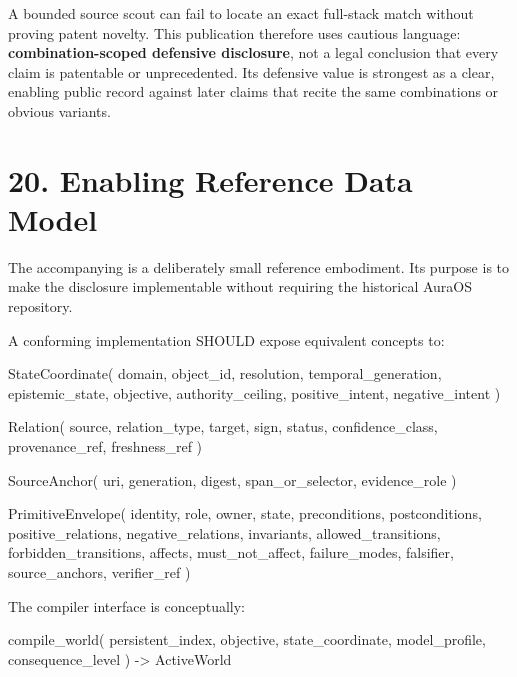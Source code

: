\documentclass[
  10pt,
  letterpaper,
]{article}
\newenvironment{Shaded}{}{}
\newcommand{\NormalTok}[1]{#1}
\newcommand{\OperatorTok}[1]{\textcolor[rgb]{0.40,0.40,0.40}{#1}}
\begin{document}
A bounded source scout can fail to locate an exact full-stack match
without proving patent novelty. This publication therefore uses cautious
language: \textbf{combination-scoped defensive disclosure}, not a legal
conclusion that every claim is patentable or unprecedented. Its
defensive value is strongest as a clear, enabling public record against
later claims that recite the same combinations or obvious variants.

\section{20. Enabling Reference Data
Model}\label{20-enabling-reference-data-model}

The accompanying \texttt{} is a
deliberately small reference embodiment. Its purpose is to make the
disclosure implementable without requiring the historical AuraOS
repository.

A conforming implementation SHOULD expose equivalent concepts to:

\begin{Shaded}
\begin{Highlighting}[]
\NormalTok{StateCoordinate(}
\NormalTok{    domain, object\_id, resolution, temporal\_generation,}
\NormalTok{    epistemic\_state, objective, authority\_ceiling,}
\NormalTok{    positive\_intent, negative\_intent}
\NormalTok{)}

\NormalTok{Relation(}
\NormalTok{    source, relation\_type, target,}
\NormalTok{    sign, status, confidence\_class,}
\NormalTok{    provenance\_ref, freshness\_ref}
\NormalTok{)}

\NormalTok{SourceAnchor(}
\NormalTok{    uri, generation, digest, span\_or\_selector, evidence\_role}
\NormalTok{)}

\NormalTok{PrimitiveEnvelope(}
\NormalTok{    identity, role, owner, state,}
\NormalTok{    preconditions, postconditions,}
\NormalTok{    positive\_relations, negative\_relations,}
\NormalTok{    invariants, allowed\_transitions, forbidden\_transitions,}
\NormalTok{    affects, must\_not\_affect,}
\NormalTok{    failure\_modes, falsifier,}
\NormalTok{    source\_anchors, verifier\_ref}
\NormalTok{)}
\end{Highlighting}
\end{Shaded}

The compiler interface is conceptually:

\begin{Shaded}
\begin{Highlighting}[]
\NormalTok{compile\_world(}
\NormalTok{    persistent\_index,}
\NormalTok{    objective,}
\NormalTok{    state\_coordinate,}
\NormalTok{    model\_profile,}
\NormalTok{    consequence\_level}
\NormalTok{) }\OperatorTok{{-}\textgreater{}}\NormalTok{ ActiveWorld}
\end{Highlighting}
\end{Shaded}
\end{document}
